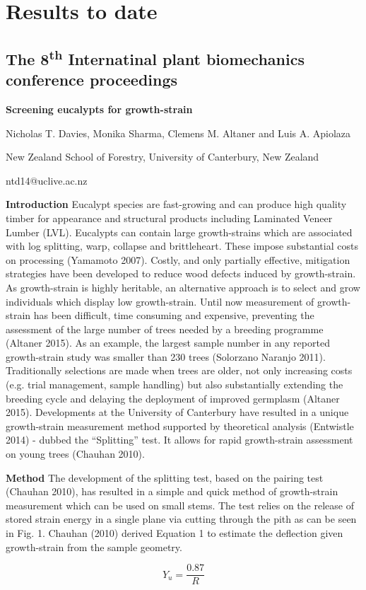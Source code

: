 \section{Results to date}
\subsection{ The 8\textsuperscript{th} Internatinal plant biomechanics conference proceedings}
\begin{center}
\textbf{Screening eucalypts for growth-strain}

Nicholas T. Davies, Monika Sharma, Clemens M. Altaner and Luis A. Apiolaza

New Zealand School of Forestry, University of Canterbury, New Zealand

ntd14@uclive.ac.nz  
\end{center}

\textbf{Introduction}
Eucalypt species are fast-growing and can produce high quality timber for appearance and structural products including Laminated Veneer Lumber (LVL). Eucalypts can contain large growth-strains which are associated with log splitting, warp, collapse and brittleheart. These impose substantial costs on processing (Yamamoto 2007). Costly, and only partially effective, mitigation strategies have been developed to reduce wood defects induced by growth-strain. As growth-strain is highly heritable, an alternative approach is to select and grow individuals which display low growth-strain. Until now measurement of growth-strain has been difficult, time consuming and expensive, preventing the assessment of the large number of trees needed by a breeding programme (Altaner 2015). As an example, the largest sample number in any reported growth-strain study was smaller than 230 trees (Solorzano Naranjo 2011). Traditionally selections are made when trees are older, not only increasing costs (e.g. trial management, sample handling) but also substantially extending the breeding cycle and delaying the deployment of improved germplasm (Altaner 2015). Developments at the University of Canterbury have resulted in a unique growth-strain measurement method supported by theoretical analysis (Entwistle 2014) - dubbed the “Splitting” test. It allows for rapid growth-strain assessment on young trees (Chauhan 2010).

\textbf{Method}
The development of the splitting test, based on the pairing test (Chauhan 2010), has resulted in a simple and quick method of growth-strain measurement which can be used on small stems. The test relies on the release of stored strain energy in a single plane via cutting through the pith as can be seen in Fig. 1. Chauhan (2010) derived Equation 1 to estimate the deflection given growth-strain from the sample geometry.

\begin{equation}
Y_u = \frac{0.87}{R}
\end{equation}
  